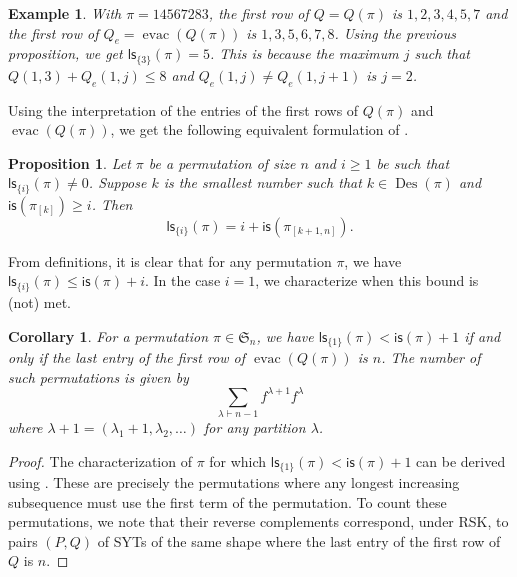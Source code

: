 \documentclass[12pt]{article}
\newcommand{\is}{\mathsf{is}}
\newcommand{\ls}{\mathsf{ls}}
\newcommand{\Des}{\operatorname{Des}}
\newcommand{\s}{\mathfrak{S}}
\newcommand{\evac}{\operatorname{evac}}
\newtheorem{corollary}[theorem] {Corollary}
\newtheorem{example}[theorem]{Example}
\newtheorem{proposition}[theorem]{Proposition}
\theoremstyle{definition}
\begin{document}
\begin{example}
    With $\pi = 1 4 5 6 7 2 8 3$, the first row of $Q = Q(\pi)$ is $1, 2, 3, 4, 5, 7$ and the first row of $Q_e = \evac(Q(\pi))$ is $1, 3, 5, 6, 7, 8$. 
    Using the previous proposition, we get $\ls_{\{3\}}(\pi) = 5$. 
    This is because the maximum $j$ such that $Q(1, 3) + Q_e(1, j) \leq 8$ and $Q_e(1, j) \neq Q_e(1, j + 1)$ is $j = 2$.
\end{example}

Using the interpretation of the entries of the first rows of $Q(\pi)$ and $\evac(Q(\pi))$, we get the following equivalent formulation of .

\begin{proposition}
    Let $\pi$ be a permutation of size $n$ and $i \geq 1$ be such that $\ls_{\{i\}}(\pi) \neq 0$. 
    Suppose $k$ is the smallest number such that $k \in \Des(\pi)$ and $\is(\pi_{[k]}) \geq i$. 
    Then
    \begin{equation*}
        \ls_{\{i\}}(\pi) = i + \is(\pi_{[k + 1, n]}).
    \end{equation*}
\end{proposition}

From definitions, it is clear that for any permutation $\pi$, we have $\ls_{\{i\}}(\pi) \leq \is(\pi) + i$. 
In the case $i = 1$, we characterize when this bound is (not) met.

\begin{corollary}
    For a permutation $\pi \in \s_n$, we have $\ls_{\{1\}}(\pi) < \is(\pi) + 1$ if and only if the last entry of the first row of $\evac(Q(\pi))$ is $n$. 
    The number of such permutations is given by
    \begin{equation*}
        \sum_{\lambda \vdash n - 1} f^{\lambda + 1} f^{\lambda}
    \end{equation*}
    where $\lambda + 1 = (\lambda_1 + 1, \lambda _2, \ldots)$ for any partition $\lambda$.
\end{corollary}

\begin{proof}
    The characterization of $\pi$ for which $\ls_{\{1\}}(\pi) < \is(\pi) + 1$ can be derived using . 
    These are precisely the permutations where any longest increasing subsequence must use the first term of the permutation. 
    To count these permutations, we note that their reverse complements correspond, under RSK, to pairs $(P, Q)$ of SYTs of the same shape where the last entry of the first row of $Q$ is $n$.
\end{proof}
\end{document}
